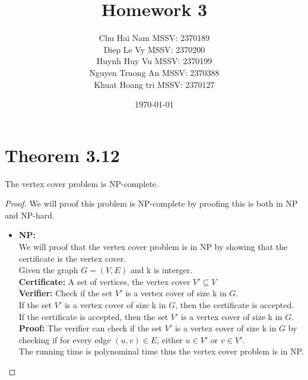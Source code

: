 \documentclass{article}
\title{Homework 3}
\author{Chu Hai Nam MSSV: 2370189 \\
        Diep Le Vy MSSV: 2370200 \\
        Huynh Huy Vu MSSV: 2370199 \\
        Nguyen Truong An MSSV: 2370388\\
        Khuat Hoang tri MSSV: 2370127}
\date\today
\begin{document}
\maketitle %

\section*{Theorem 3.12}
    The vertex cover problem is NP-complete.

\begin{proof}
    We will proof this problem is NP-complete by proofing this is both in NP and NP-hard.
    \begin{itemize}
        \item \textbf{NP:} \\
        We will proof that the vertex cover problem is in NP by showing that the certificate is the vertex cover.\\
        Given the graph $G = (V,E)$ and k is interger.\\
        \textbf{Certificate:} A set of vertices, the vertex cover $V'\subseteq V$\\
        \textbf{Verifier:} Check if the set $V'$ is a vertex cover of size k in $G$.\\
        If the set $V'$ is a vertex cover of size k in $G$, then the certificate is accepted.\\
        If the certificate is accepted, then the set $V'$ is a vertex cover of size k in $G$.\\
        \textbf{Proof:} The verifier can check if the set $V'$ is a vertex cover of size k in $G$ by checking if for every edge $(u,v) \in E$, either $u \in V'$ or $v \in V'$.\\
        The running time is polynominal time thus the vertex cover problem is in NP.


\end{itemize}
\end{proof}
\end{document}
